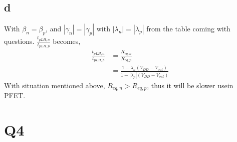 \documentclass[a4paper,10pt]{article}
\begin{document}
\subsection*{d}
With \begin{math}\beta_n = \beta_p\end{math}, and \begin{math}|\gamma_n| = |\gamma_p|\end{math} with 
\begin{math}|\lambda_n| = |\lambda_p|\end{math} from the table coming with questions.
\begin{math}\frac{t_{pLH, n}}{t_{pLH, p}}\end{math} becomes,
\begin{equation}
 \begin{split}
  \frac{t_{pLH, n}}{t_{pLH, p}} &= \frac{R_{eq, n}}{R_{eq, p}} \\
  &= \frac{1 - \lambda_n (V_{DD} - V_{out})}{1-|\lambda_p|(V_{DD} - V_{out})}
 \end{split}
\end{equation}
With situation mentioned above, \begin{math}R_{eq, n} > R_{eq, p}\end{math}, thus it will be slower usein PFET.
\section*{Q4}
\end{document}
